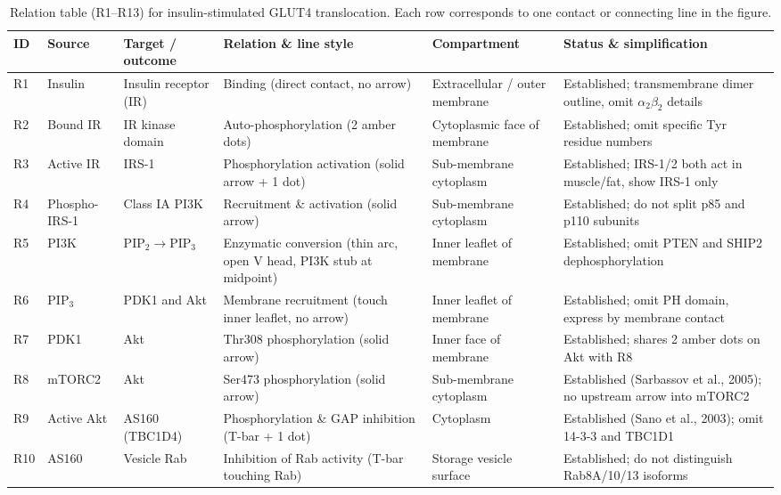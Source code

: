 \begin{table}[htbp]\centering\scriptsize
\setlength{\tabcolsep}{3pt}
\renewcommand{\arraystretch}{0.95}
\caption{Relation table (R1--R13) for insulin-stimulated GLUT4 translocation. Each row corresponds to one contact or connecting line in the figure.}\label{tab:ch07-01}
\begin{tabularx}{\linewidth}{lYYYYY}
\toprule
\textbf{ID} & \textbf{Source} & \textbf{Target / outcome} & \textbf{Relation \& line style} & \textbf{Compartment} & \textbf{Status \& simplification} \\
\midrule
R1 & Insulin & Insulin receptor (IR) & Binding (direct contact, no arrow) & Extracellular / outer membrane & Established; transmembrane dimer outline, omit $\alpha_2\beta_2$ details \\
R2 & Bound IR & IR kinase domain & Auto-phosphorylation (2 amber dots) & Cytoplasmic face of membrane & Established; omit specific Tyr residue numbers \\
R3 & Active IR & IRS-1 & Phosphorylation activation (solid arrow + 1 dot) & Sub-membrane cytoplasm & Established; IRS-1/2 both act in muscle/fat, show IRS-1 only \\
R4 & Phospho-IRS-1 & Class IA PI3K & Recruitment \& activation (solid arrow) & Sub-membrane cytoplasm & Established; do not split p85 and p110 subunits \\
R5 & PI3K & $\text{PIP}_2 \rightarrow \text{PIP}_3$ & Enzymatic conversion (thin arc, open V head, PI3K stub at midpoint) & Inner leaflet of membrane & Established; omit PTEN and SHIP2 dephosphorylation \\
R6 & $\text{PIP}_3$ & PDK1 and Akt & Membrane recruitment (touch inner leaflet, no arrow) & Inner leaflet of membrane & Established; omit PH domain, express by membrane contact \\
R7 & PDK1 & Akt & Thr308 phosphorylation (solid arrow) & Inner face of membrane & Established; shares 2 amber dots on Akt with R8 \\
R8 & mTORC2 & Akt & Ser473 phosphorylation (solid arrow) & Sub-membrane cytoplasm & Established (Sarbassov et al., 2005); no upstream arrow into mTORC2 \\
R9 & Active Akt & AS160 (TBC1D4) & Phosphorylation \& GAP inhibition (T-bar + 1 dot) & Cytoplasm & Established (Sano et al., 2003); omit 14-3-3 and TBC1D1 \\
R10 & AS160 & Vesicle Rab & Inhibition of Rab activity (T-bar touching Rab) & Storage vesicle surface & Established; do not distinguish Rab8A/10/13 isoforms \\

\end{tabularx}
\end{table}
